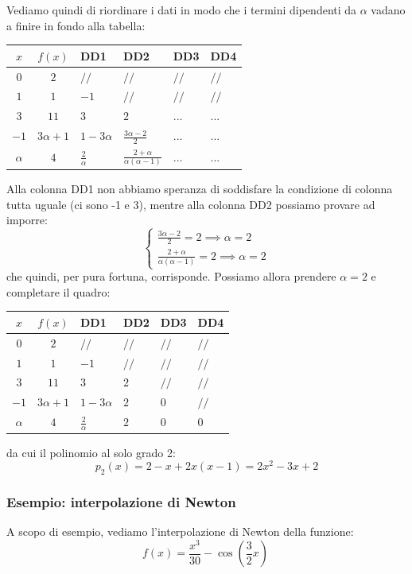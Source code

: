 \documentclass[a4paper,11pt]{article}
\begin{document}
Vediamo quindi di riordinare i dati in modo che i termini dipendenti da $\alpha$ vadano a finire in fondo alla tabella:
\begin{table}[H]
	\center 
	\begin{tabular} { c | c | p{1cm} p{1cm} p{1cm} p{1cm} }
		$x$ & $f(x)$ & DD1 & DD2 & DD3 & DD4\\
		\hline
		$0 $ & $ 2 $ & $ // $ & $ // $ & $ // $ & $ // $ \\
		$1 $ & $ 1 $ & $ -1 $ & $ // $ & $ // $ & $ // $ \\
		$3 $ & $ 11 $ & $ 3 $ & $ 2 $ & $ ...$ & $...$ \\
		$-1$ & $3 \alpha + 1$ & $1 - 3 \alpha$ & $\frac{3 \alpha - 2}{2}$ & $...$ & $...$ \\
		$\alpha$ & $4$ & $\frac{2}{\alpha}$ & $\frac{2 + \alpha}{\alpha(\alpha - 1)}$ & $...$ & $...$
	\end{tabular}
\end{table}

Alla colonna DD1 non abbiamo speranza di soddisfare la condizione di colonna tutta uguale (ci sono -1 e 3), mentre alla colonna DD2 possiamo provare ad imporre:
\[
	\begin{cases}
		\frac{3 \alpha - 2}{2} = 2 \implies \alpha = 2 \\
		\frac{2 + \alpha}{\alpha(\alpha - 1)} = 2 \implies \alpha = 2
	\end{cases}
\]
che quindi, per pura fortuna, corrisponde.
Possiamo allora prendere $\alpha = 2$ e completare il quadro:
\begin{table}[H]
	\center 
	\begin{tabular} { c | c | p{1cm} p{1cm} p{1cm} p{1cm} }
		$x$ & $f(x)$ & DD1 & DD2 & DD3 & DD4\\
		\hline
		$0 $ & $ 2 $ & $ // $ & $ // $ & $ // $ & $ // $ \\
		$1 $ & $ 1 $ & $ -1 $ & $ // $ & $ // $ & $ // $ \\
		$3 $ & $ 11 $ & $ 3 $ & $ 2 $ & $ // $ & $ // $ \\
		$-1$ & $3 \alpha + 1$ & $1 - 3 \alpha$ & $2$ & $0$ & $ // $ \\
		$\alpha$ & $4$ & $\frac{2}{\alpha}$ & $2$ & $0$ & $0$
	\end{tabular}
\end{table}
da cui il polinomio al solo grado 2:
$$
p_2(x) = 2 - x + 2x(x - 1) = 2x^2 - 3x + 2
$$

\subsubsection{Esempio: interpolazione di Newton}
A scopo di esempio, vediamo l'interpolazione di Newton della funzione:
$$
f\left(x\right)=\frac{x^{3}}{30}-\cos\left(\frac{3}{2}x\right)\ 
$$
\end{document}
